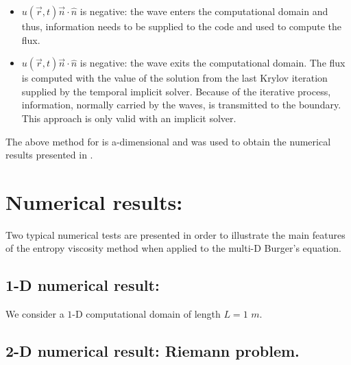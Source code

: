 \begin{itemize}
\item $u(\vec{r},t) \vec{n} \cdot \hat{n} $ is negative: the wave enters the computational domain and thus, information needs to be supplied to the code and used to compute the flux.
\item $u(\vec{r},t) \vec{n} \cdot \hat{n} $ is negative: the wave exits the computational domain. The flux is computed with the value of the solution from the last Krylov iteration supplied by the temporal implicit solver. Because of the iterative process, information, normally carried by the waves, is transmitted to the boundary. This approach is only valid with an implicit solver.
\end{itemize}
The above method for is a-dimensional and was used to obtain the numerical results presented in .
\section{Numerical results:}\label{sec:num_sct2b}
Two typical numerical tests are presented in order to illustrate the main features of the entropy viscosity method when applied to the multi-D Burger's equation.
%
\subsection{1-D numerical result:}\label{sec:1dnum_sct2b}
We consider a $1$-D computational domain of length $L=1$ $m$.
%
\subsection{2-D numerical result: Riemann problem.}\label{sec:2dnum_sct2b}
%